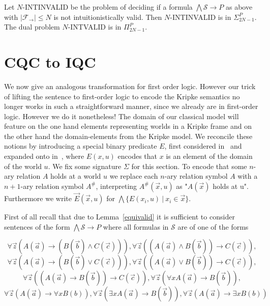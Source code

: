 \documentclass[a4paper,UKenglish,cleveref, autoref, thm-restate]{lipics-v2021}
\begin{document}
\begin{corollary}
	Let $N$-INTINVALID be the problem of deciding if a formula $\bigwedge \mathcal S\to P$ as above with $|\mathcal F_\to|\leq N$ is not intuitionistically valid. Then $N$-INTINVALID is in $\Sigma_{2N-1}^P$. The dual problem $N$-INTVALID is in $\Pi_{2N-1}^P$.
\end{corollary}

\section{CQC to IQC}

We now give an analogous transformation for first order logic. However our trick of lifting the sentence to first-order logic to encode the Kripke semantics no longer works in such a straightforward manner, since we already are in first-order logic. However we do it nonetheless! The domain of our classical model will feature on the one hand elements representing worlds in a Kripke frame and on the other hand the domain-elements from the Kripke model. We reconcile these notions by introducing a special binary predicate $E$, first considered in~\cite{baaz2006skolemization} and expanded onto in~\cite{iemhoff2010eskolemization}, where $E(x, u)$ encodes that $x$ is an element of the domain of the world $u$. We fix some signature $\Sigma$ for this section. To encode that some $n$-ary relation $A$ holds at a world $u$ we replace each $n$-ary relation symbol $A$ with a $n+1$-ary relation symbol $A^\#$, interpreting $A^\#(\vec x, u)$ as "$A(\vec x)$ holds at u". Furthermore we write $\vec E(\vec x, u)$ for $\bigwedge\{E(x_i, u)\:|\:x_i\in \vec x\}$. 

First of all recall that due to Lemma~\ref{equivalid} it is sufficient to consider sentences of the form $\bigwedge\mathcal S\to P$ where all formulas in $\mathcal S$ are of one of the forms

$$\forall \vec z(A(\vec a)\to (B(\vec b)\wedge C(\vec c))), \forall \vec z((A(\vec a)\wedge B(\vec b))\to C(\vec c)),$$$$ \forall \vec z(A(\vec a)\to (B(\vec b)\vee C(\vec c))),
\forall \vec z((A(\vec a)\vee B(\vec b))\to C(\vec c)),$$$$ \forall \vec z((A(\vec a)\to B(\vec b))\to C(\vec c)),\forall \vec z(\forall xA(\vec a)\to B(\vec b)),$$$$ \forall \vec z(A(\vec a)\to\forall xB(b)), \forall \vec z(\exists xA(\vec a)\to B(\vec b)), \forall \vec z(A(\vec a)\to\exists xB(b))$$	
\end{document}
